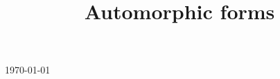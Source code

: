 

\title{Automorphic forms}

\usepackage[sort=standard]{glossaries} 
\makeglossaries



\maketitle
\centerline{\today}
\tableofcontents







